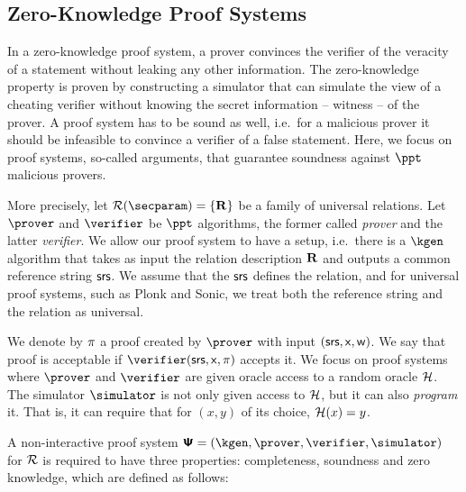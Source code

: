 \subsection{Zero-Knowledge Proof Systems}\label{prelim:nizk}
In a zero-knowledge proof system, a prover convinces the verifier of the veracity of a statement
without leaking any other information. The zero-knowledge property is proven by constructing a
simulator that can simulate the view of a cheating verifier without knowing the secret
information -- witness -- of the prover. A proof system has to be sound as well, i.e.~for a
malicious prover it should be infeasible to convince a verifier of a false statement. Here, we
focus on proof systems, so-called arguments, that guarantee soundness against $\ppt$ malicious provers.

More precisely, let $\RELGEN(\secparam) = \smallset{\REL}$ be a family of universal 
relations. Let $\prover$ and $\verifier$ be $\ppt$ algorithms, the former called \emph{prover}
and the latter \emph{verifier}. We allow our proof system to have a setup, i.e.~there is a
$\kgen$ algorithm that takes as input the relation description $\mathbf{R}$ and outputs a common
reference string $\mathsf{srs}$. We assume that the $\mathsf{srs}$ defines the relation, and for universal proof
systems, such as Plonk and Sonic, we treat both the reference string and the relation as
universal.

We denote by $\pi$ a proof created by $\prover$ with input
$(\mathsf{srs}, \mathsf{x}, \mathsf{w})$. We say that proof is acceptable if $\verifier (\srs, \inp,
\zkproof)$ accepts it. We focus on proof systems where $\prover$ and
$\verifier$ are given oracle access to a random oracle $\mathcal{H}$. The simulator
$\simulator$ is not only given access to $\mathcal{H}$, but it can also \emph{program}
it. That is, it can require that for $(x, y)$ of its choice, $\mathcal{H} (x) = y$.

A non-interactive  proof system $\proofsystem = (\kgen, \prover, \verifier, \simulator)$ for $\mathcal{R}$ is
required to have three properties: completeness, soundness and zero knowledge, which are
defined as follows:

